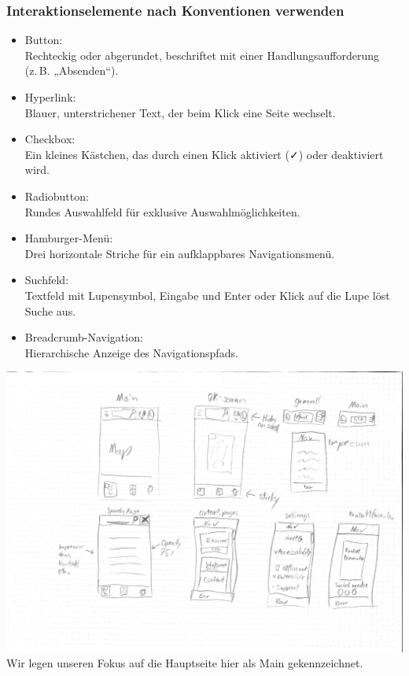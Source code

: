 \documentclass[10pt]{article}
\newcounter{subsubsubsection}[subsubsection]
\begin{document}
	\subsubsection{Interaktionselemente nach Konventionen verwenden}
	\begin{itemize}
		\item Button:\\
		Rechteckig oder abgerundet, beschriftet mit einer Handlungsaufforderung (z. B. „Absenden“).
		\item Hyperlink:\\
		Blauer, unterstrichener Text, der beim Klick eine Seite wechselt.
		\item Checkbox:\\
		Ein kleines Kästchen, das durch einen Klick aktiviert (✓) oder deaktiviert wird.
		\item Radiobutton:\\
		Rundes Auswahlfeld für exklusive Auswahlmöglichkeiten.
		\item Hamburger-Menü:\\
		Drei horizontale Striche für ein aufklappbares Navigationsmenü.
		\item Suchfeld:\\
		Textfeld mit Lupensymbol, Eingabe und Enter oder Klick auf die Lupe löst Suche aus.
		\item Breadcrumb-Navigation:\\
		Hierarchische Anzeige des Navigationspfads.
	\end{itemize}
	\includegraphics[width=17cm]{scribles-2-1}
	Wir legen unseren Fokus auf die Hauptseite hier als Main gekennzeichnet.\\
\end{document}

